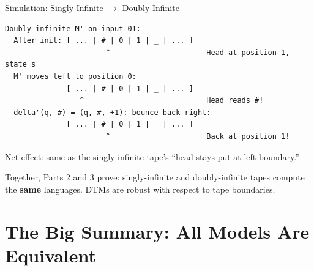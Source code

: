 \documentclass[11pt,a4paper]{article}
\newcommand{\kt}[1]{\par\vspace{0.3em}\colorbox{yellow!60}{\parbox{\dimexpr\linewidth-2\fboxsep}{#1}}\vspace{0.3em}}
\begin{document}
\begin{examplebox}{{Simulation: Singly-Infinite $\to$ Doubly-Infinite}}
\begin{lstlisting}
Doubly-infinite M' on input 01:
  After init: [ ... | # | 0 | 1 | _ | ... ]
                       ^                      Head at position 1, state s
  M' moves left to position 0:
              [ ... | # | 0 | 1 | _ | ... ]
                 ^                            Head reads #!
  delta'(q, #) = (q, #, +1): bounce back right:
              [ ... | # | 0 | 1 | _ | ... ]
                       ^                      Back at position 1!
\end{lstlisting}

Net effect: same as the singly-infinite tape's ``head stays put at left boundary.''

\kt{Together, Parts 2 and 3 prove: singly-infinite and doubly-infinite tapes compute the \textbf{same} languages. DTMs are robust with respect to tape boundaries.}
\end{examplebox}


\newpage
\section{The Big Summary: All Models Are Equivalent}
\end{document}
